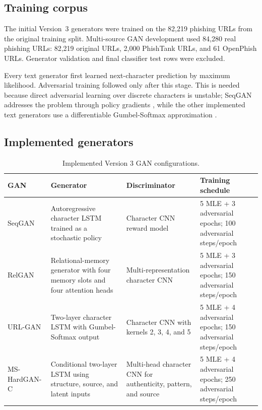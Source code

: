 \subsection{Training corpus}

The initial Version~3 generators were trained on the 82,219 phishing URLs from
the original training split. Multi-source GAN development used 84,280 real
phishing URLs: 82,219 original URLs, 2,000 PhishTank URLs, and 61 OpenPhish
URLs. Generator validation and final classifier test rows were excluded.

Every text generator first learned next-character prediction by maximum
likelihood. Adversarial training followed only after this stage. This is needed
because direct adversarial learning over discrete characters is unstable;
SeqGAN addresses the problem through policy gradients \citep{yu2017seqgan},
while the other implemented text generators use a differentiable
Gumbel-Softmax approximation \citep{jang2017gumbel}.

\subsection{Implemented generators}

\begin{table}[htbp]
\centering
\caption{Implemented Version 3 GAN configurations.}
\label{tab:method-gans}
\small
\begin{tabular}{@{}p{}p{}p{}p{}@{}}
\toprule
GAN & Generator & Discriminator & Training schedule \\
\midrule
SeqGAN & Autoregressive character LSTM trained as a stochastic policy & Character CNN reward model & 5 MLE + 3 adversarial epochs; 100 adversarial steps/epoch \\
RelGAN & Relational-memory generator with four memory slots and four attention heads & Multi-representation character CNN & 5 MLE + 3 adversarial epochs; 150 adversarial steps/epoch \\
URL-GAN & Two-layer character LSTM with Gumbel-Softmax output & Character CNN with kernels 2, 3, 4, and 5 & 5 MLE + 4 adversarial epochs; 150 adversarial steps/epoch \\
MS-HardGAN-C & Conditional two-layer LSTM using structure, source, and latent inputs & Multi-head character CNN for authenticity, pattern, and source & 5 MLE + 4 adversarial epochs; 250 adversarial steps/epoch \\
\bottomrule
\end{tabular}
\end{table}

